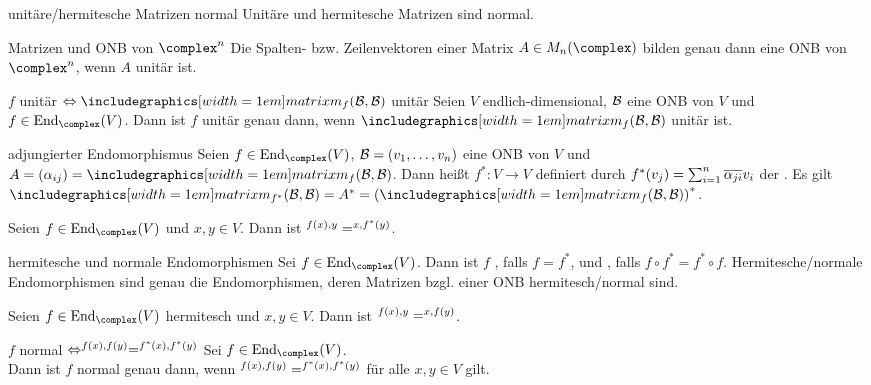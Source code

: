 \begin{Lemma}{unitäre/hermitesche Matrizen normal}
    Unitäre und hermitesche Matrizen sind normal.
\end{Lemma}

\begin{Satz}{Matrizen und ONB von $\complex^n$}
    Die Spalten- bzw. Zeilenvektoren einer Matrix $A \in M_n(\complex)$ bilden
    genau dann eine ONB von $\complex^n$, wenn $A$ unitär ist.
\end{Satz}

\begin{Satz}{$f$ unitär $\Leftrightarrow \hommatrix{f}{B}{B}$ unitär}
    Seien $V$ endlich-dimensional, $\mathcal{B}$ eine ONB von $V$ und \\
    $f \in \End_\complex(V)$.
    Dann ist $f$ unitär genau dann, wenn $\hommatrix{f}{B}{B}$ unitär ist.
\end{Satz}

\begin{Def}{adjungierter Endomorphismus}
    Seien $f \in \End_\complex(V)$, $\mathcal{B} = (v_1, \ldots, v_n)$ eine
    ONB von $V$ und $A = (\alpha_{ij}) = \hommatrix{f}{B}{B}$.
    Dann heißt $f^\ast: V \rightarrow V$ definiert durch
    $f^\ast(v_j) = \sum_{i=1}^n \overline{\alpha_{ji}} v_i$ der
    .
    Es gilt $\hommatrix{f^\ast}{B}{B} = A^\ast =
    \left(\hommatrix{f}{B}{B}\right)^\ast$.
\end{Def}

\begin{Kor}
    Seien $f \in \End_\complex(V)$ und $x, y \in V$.
    Dann ist $\sp{f(x), y} = \sp{x, f^\ast(y)}$.
\end{Kor}

\begin{Def}{hermitesche und normale Endomorphismen}
    Sei $f \in \End_\complex(V)$.
    Dann ist $f$ , falls $f = f^\ast$,
    und , falls $f \circ f^\ast = f^\ast \circ f$.
    Hermitesche/normale Endomorphismen sind genau die Endomorphismen, deren
    Matrizen bzgl. einer ONB hermitesch/normal sind.
\end{Def}

\begin{Kor}
    Seien $f \in \End_\complex(V)$ hermitesch und $x, y \in V$.
    Dann ist $\sp{f(x), y} = \sp{x, f(y)}$.
\end{Kor}

\begin{Satz}%
{$f$ normal $\Leftrightarrow \sp{f(x), f(y)} = \sp{f^\ast(x), f^\ast(y)}$}
    Sei $f \in \End_\complex(V)$. \\
    Dann ist $f$ normal genau dann, wenn
    $\sp{f(x), f(y)} = \sp{f^\ast(x), f^\ast(y)}$ für alle $x, y \in V$ gilt.
\end{Satz}

